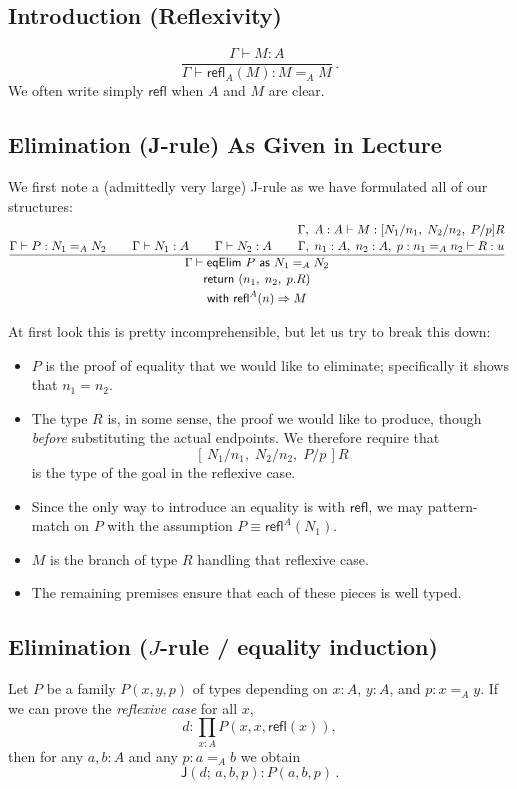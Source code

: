 \documentclass[11pt]{article}
\newcommand{\Id}[3]{#1 =_{#2} #3}
\newcommand{\refl}{\mathsf{refl}}
\newcommand{\eqelim}{\mathsf{J}}
\newcommand{\ctx}{\Gamma}
\theoremstyle{definition}
\theoremstyle{plain}
\theoremstyle{remark}
\begin{document}
\subsection{Introduction (Reflexivity)}
\begin{equation*}
\frac{\ctx \vdash M : A}{\ctx \vdash \refl_A(M) : \Id{M}{A}{M}} \, .
\end{equation*}
We often write simply $\refl$ when $A$ and $M$ are clear.

\subsection{Elimination (J-rule) As Given in Lecture}

We first note a (admittedly very large) J-rule as we have formulated all of our structures:
\begin{gather*}
\infer[]{%
  \deduce[]{%
    \deduce[]{\textsf{with }\refl^A(n) \Rightarrow M}{\textsf{return } (n_1,\; n_2,\; p.R)}%
  }{\Gamma \vdash \textsf{eqElim } P \textsf{ as } N_1 =_A N_2}%
}{%
  \Gamma \vdash P : N_1 =_A N_2
  \;\; & \;\;
  \Gamma \vdash N_1 : A
  \;\; & \;\;
  \Gamma \vdash N_2 : A
  \;\; & \;\;
  \deduce[]{%
    \Gamma,\; n_1 : A,\; n_2 : A,\; p : n_1 =_A n_2 \vdash R : u
  }{%
    \Gamma,\; A : A \vdash M : [N_1/n_1,\; N_2/n_2,\; P/p]R
  }%
}
\end{gather*}

At first look this is pretty incomprehensible, but let us try to break this down:
\begin{itemize}
  \item $P$ is the proof of equality that we would like to eliminate; specifically it shows that
        $n_1 = n_2$.
  \item The type $R$ is, in some sense, the proof we would like to produce, though
        \emph{before} substituting the actual endpoints.  
        We therefore require that
        \[
           [\,N_1/n_1,\; N_2/n_2,\; P/p\,]R
        \]
        is the type of the goal in the reflexive case.
  \item Since the only way to introduce an equality is with $\refl$, we may pattern-match on $P$
        with the assumption $P \equiv \refl^A(N_1)$.
  \item $M$ is the branch of type $R$ handling that reflexive case.
  \item The remaining premises ensure that each of these pieces is well typed.
\end{itemize}

\subsection{Elimination ($J$-rule / equality induction)}
Let $P$ be a family $P(x,y,p)$ of types depending on $x{:}A$, $y{:}A$, and $p{:}\Id{x}{A}{y}$. If we can prove the \emph{reflexive case} for all $x$,
\begin{equation*}
d : \prod_{x:A} P(x,x,\refl(x)),
\end{equation*}
then for any $a,b{:}A$ and any $p{:}\Id{a}{A}{b}$ we obtain
\begin{equation*}
\eqelim(d;\,a,b,p) : P(a,b,p) \, .
\end{equation*}
\end{document}
